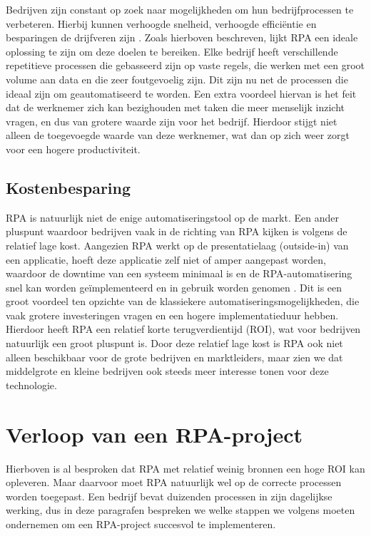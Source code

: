 Bedrijven zijn constant op zoek naar mogelijkheden om hun bedrijfprocessen te verbeteren. Hierbij kunnen verhoogde snelheid, verhoogde efficiëntie en besparingen de drijfveren zijn \autocite{Axmann2022}. Zoals hierboven beschreven, lijkt RPA een ideale oplossing te zijn om deze doelen te bereiken. Elke bedrijf heeft verschillende repetitieve processen die gebasseerd zijn op vaste regels, die werken met een groot volume aan data en die zeer foutgevoelig zijn. Dit zijn nu net de processen die ideaal zijn om geautomatiseerd te worden. Een extra voordeel hiervan is het feit dat de werknemer zich kan bezighouden met taken die meer menselijk inzicht vragen, en dus van grotere waarde zijn voor het bedrijf. Hierdoor stijgt niet alleen de toegevoegde waarde van deze werknemer, wat dan op zich weer zorgt voor een hogere productiviteit.

\subsection{Kostenbesparing}

RPA is natuurlijk niet de enige automatiseringstool op de markt. Een ander pluspunt waardoor bedrijven vaak in de richting van RPA kijken is volgens \textcite{Fernandez2021} de relatief lage kost. Aangezien RPA werkt op de presentatielaag (outside-in) van een applicatie, hoeft deze applicatie zelf niet of amper aangepast worden, waardoor de downtime van een systeem minimaal is en de RPA-automatisering snel kan worden geïmplementeerd en in gebruik worden genomen \autocite{Asquith2019}. Dit is een groot voordeel ten opzichte van de klassiekere automatiseringsmogelijkheden, die vaak grotere investeringen vragen en een hogere implementatieduur hebben. Hierdoor heeft RPA een relatief korte terugverdientijd (ROI), wat voor bedrijven natuurlijk een groot pluspunt is.
Door deze relatief lage kost is RPA ook niet alleen beschikbaar voor de grote bedrijven en marktleiders, maar zien we dat middelgrote en kleine bedrijven ook steeds meer interesse tonen voor deze technologie.

\section{Verloop van een RPA-project}

Hierboven is al besproken dat RPA met relatief weinig bronnen een hoge ROI kan opleveren.
Maar daarvoor moet RPA natuurlijk wel op de correcte processen worden toegepast.
Een bedrijf bevat duizenden processen in zijn dagelijkse werking, dus in deze paragrafen bespreken we welke stappen we volgens \textcite{El-Gharib2023} moeten ondernemen om een RPA-project succesvol te implementeren.


